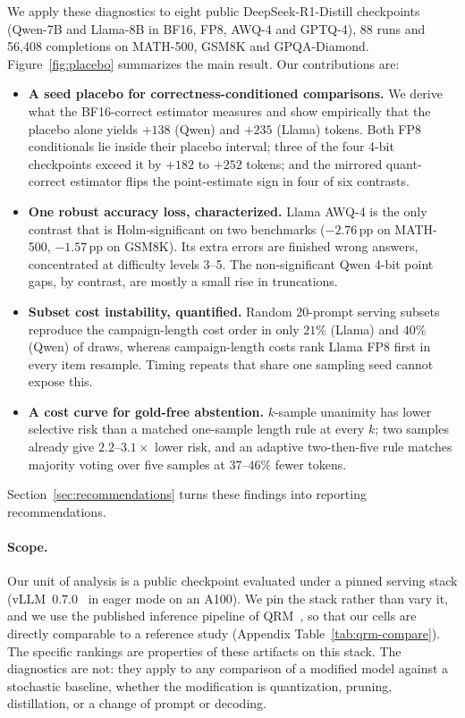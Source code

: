 \documentclass[11pt,a4paper]{article}
\begin{document}
We apply these diagnostics to eight public DeepSeek-R1-Distill checkpoints (Qwen-7B and Llama-8B in BF16, FP8, AWQ-4 and GPTQ-4), 88 runs and 56{,}408 completions on MATH-500, GSM8K and GPQA-Diamond. Figure~\ref{fig:placebo} summarizes the main result. Our contributions are:
\begin{itemize}
    \item[\textbf{C1}] \textbf{A seed placebo for correctness-conditioned comparisons.} We derive what the BF16-correct estimator measures and show empirically that the placebo alone yields $+138$ (Qwen) and $+235$ (Llama) tokens. Both FP8 conditionals lie inside their placebo interval; three of the four 4-bit checkpoints exceed it by $+182$ to $+252$ tokens; and the mirrored quant-correct estimator flips the point-estimate sign in four of six contrasts.
    \item[\textbf{C2}] \textbf{One robust accuracy loss, characterized.} Llama AWQ-4 is the only contrast that is Holm-significant on two benchmarks ($-2.76$\,pp on MATH-500, $-1.57$\,pp on GSM8K). Its extra errors are finished wrong answers, concentrated at difficulty levels 3--5. The non-significant Qwen 4-bit point gaps, by contrast, are mostly a small rise in truncations.
    \item[\textbf{C3}] \textbf{Subset cost instability, quantified.} Random 20-prompt serving subsets reproduce the campaign-length cost order in only $21\%$ (Llama) and $40\%$ (Qwen) of draws, whereas campaign-length costs rank Llama FP8 first in every item resample. Timing repeats that share one sampling seed cannot expose this.
    \item[\textbf{C4}] \textbf{A cost curve for gold-free abstention.} $k$-sample unanimity has lower selective risk than a matched one-sample length rule at every $k$; two samples already give $2.2$--$3.1\times$ lower risk, and an adaptive two-then-five rule matches majority voting over five samples at $37$--$46\%$ fewer tokens.
\end{itemize}
Section~\ref{sec:recommendations} turns these findings into reporting recommendations.

\paragraph{Scope.} Our unit of analysis is a public checkpoint evaluated under a pinned serving stack (vLLM~0.7.0~\cite{kwon2023vllm} in eager mode on an A100). We pin the stack rather than vary it, and we use the published inference pipeline of QRM~\cite{liu2025qrm}, so that our cells are directly comparable to a reference study (Appendix Table~\ref{tab:qrm-compare}). The specific rankings are properties of these artifacts on this stack. The diagnostics are not: they apply to any comparison of a modified model against a stochastic baseline, whether the modification is quantization, pruning, distillation, or a change of prompt or decoding.
\end{document}
